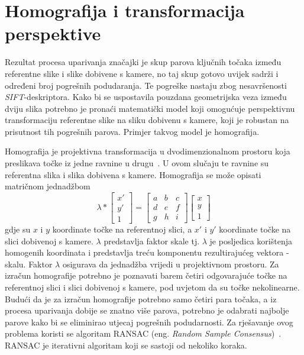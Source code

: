 \section{Homografija i transformacija perspektive}

Rezultat procesa uparivanja značajki je skup parova ključnih točaka između referentne slike i slike dobivene s kamere, no taj skup gotovo uvijek sadrži i određeni broj pogrešnih podudaranja. Te pogreške nastaju zbog nesavršenosti \textit{SIFT}-deskriptora. Kako bi se uspostavila pouzdana geometrijska veza između dviju slika potrebno je pronaći matematički model koji omogućuje perspektivnu transformaciju referentne slike na sliku dobivenu s kamere, koji je robustan na prisutnost tih pogrešnih parova. Primjer takvog model je homografija. 

Homografija je projektivna transformacija u dvodimenzionalnom prostoru koja preslikava točke iz jedne ravnine u drugu~\cite{foundationsCVbook}. U ovom slučaju te ravnine su referentna slika i slika dobivena s kamere. Homografija se može opisati matričnom jednadžbom
\begin{equation}
    \lambda *
    \begin{bmatrix}
        x' \\
        y' \\
        1
    \end{bmatrix}
    =
    \begin{bmatrix}
        a & b & c \\
        d & e & f \\
        g & h & i
    \end{bmatrix}
    \begin{bmatrix}
        x \\
        y \\
        1
    \end{bmatrix}
\end{equation}
gdje su $x$ i $y$ koordinate točke na referentnoj slici, a $x'$ i $y'$ koordinate točke na slici dobivenoj s kamere. $\lambda$ predstavlja faktor skale tj. $\lambda$ je posljedica korištenja homogenih koordinata i predstavlja treću komponentu rezultirajućeg vektora - skalu. Faktor $\lambda$ osigurava da jednadžba vrijedi u projektivnom prostoru. Za izračun homografije potrebno je poznavati barem četiri odgovarajuće točke na referentnoj slici i slici dobivenoj s kamere, pod uvjetom da su točke nekolinearne.
Budući da je za izračun homografije potrebno samo četiri para točaka, a iz procesa uparivanja dobije se znatno više parova, potrebno je odabrati najbolje parove kako bi se eliminirao utjecaj pogrešnih podudarnosti. Za rješavanje ovog problema koristi se algoritam RANSAC (eng. \textit{Random Sample Consensus})~\cite{derpanis2010overview}. RANSAC je iterativni algoritam koji se sastoji od nekoliko koraka. 
